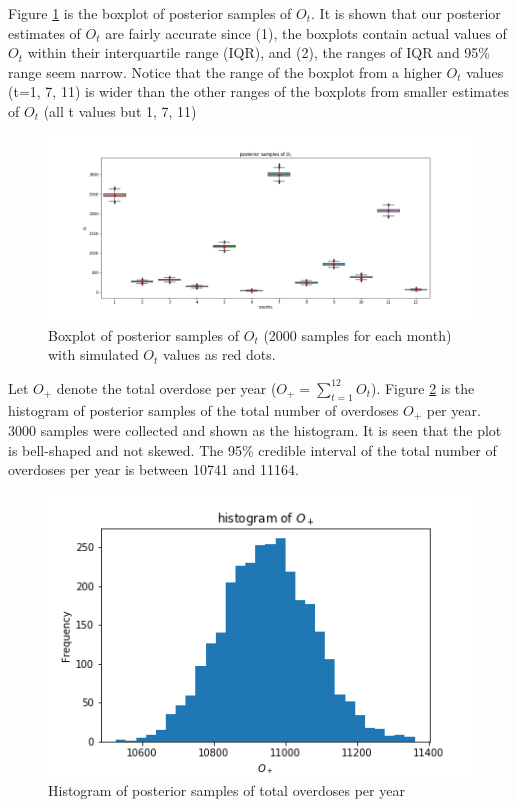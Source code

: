 \documentclass[12pt]{article}
\begin{document}
{Figure \ref{pst_ot} is the boxplot of posterior samples of $O_t$. It is shown that our posterior estimates of  $O_t$ are fairly accurate since (1), the boxplots contain actual values of $O_t$ within their interquartile range (IQR), and (2), the ranges of IQR and 95\% range seem narrow. Notice that the range of the boxplot from a higher $O_t$ values (t=1, 7, 11) is wider than the other ranges of the boxplots from smaller estimates of $O_t$ (all t values but 1, 7, 11)\\

\begin{figure}[h]
	\centering
	\includegraphics[width=1\linewidth]{Figures/earlyresult1_ot.png}
	\caption{Boxplot of posterior samples of $O_t$ (2000 samples for each month) with simulated $O_t$ values as red dots.}
	\label{pst_ot}
\end{figure}

Let $O_+$ denote the total overdose per year ($O_+ = \sum_{t=1}^{12}O_t $). Figure \ref{hst_ot} is the histogram of posterior samples of the total number of overdoses $O_+$ per year. 3000 samples were collected and shown as the histogram.  It is seen that the plot is bell-shaped and not skewed. The 95\% credible interval of the total number of overdoses per year is between 10741 and 11164.\\

\begin{figure}[h]
	\centering
	\includegraphics[width=1\linewidth]{Figures/hist_sum_ot.png}
	\caption{Histogram of posterior samples of total overdoses per year}
	\label{hst_ot}
\end{figure}

}
\end{document}
